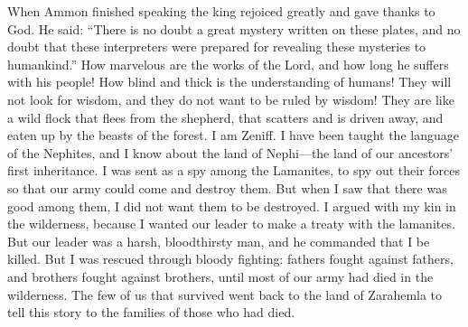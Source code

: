 When Ammon finished speaking the king rejoiced greatly and gave thanks to God. He said:  ``There is no doubt a great mystery written on these plates, and no doubt that these interpreters were prepared for revealing these mysteries to humankind.''
\bverse \iffalse O how marvelous are the works of the Lord, and how long doth he suffer with his people; yea, and how blind and impenetrable are the understandings of the children of men; for they will not seek wisdom, neither do they desire that she should rule over them! \fi
How marvelous are the works of the Lord, and how long he suffers with his people! How blind and thick is the understanding of humans! They will not look for wisdom, and they do not want to be ruled by wisdom!
\bverse \iffalse Yea, they are as a wild flock which fleeth from the shepherd, and scattereth, and are driven, and are devoured by the beasts of the forest. \fi
They are like a wild flock that flees from the shepherd, that scatters and is driven away, and eaten up by the beasts of the forest.
\bchapter
\bverse \iffalse I, Zeniff, having been taught in all the language of the Nephites, and having had a knowledge of the land of Nephi, or of the land of our fathers' first inheritance, and having been sent as a spy among the Lamanites that I might spy out their forces, that our army might come upon them and destroy them--but when I saw that which was good among them I was desirous that they should not be destroyed. \fi
I am Zeniff. I have been taught the language of the Nephites, and I know about the land of Nephi---the land of our ancestors' first inheritance. I was sent as a spy among the Lamanites, to spy out their forces so that our army could come and destroy them. But when I saw that there was good among them, I did not want them to be destroyed.
\bverse \iffalse Therefore, I contended with my brethren in the wilderness for I would that our ruler should make a treaty with them; but he being an austere and a bloodthirsty man commanded that I should be slain; but I was rescued by the shedding of much blood; for father fought against father, and brother against brother, until the greater number of our army was destroyed in the wilderness; and we returned, those of us that were spared, to the land of Zarahemla, to relate that tale to their wives and their children. \fi
I argued with my kin in the wilderness, because I wanted our leader to make a treaty with the lamanites. But our leader was a harsh, bloodthirsty man, and he commanded that I be killed. But I was rescued through bloody fighting: fathers fought against fathers, and brothers fought against brothers, until most of our army had died in the wilderness. The few of us that survived went back to the land of Zarahemla to tell this story to the families of those who had died.

